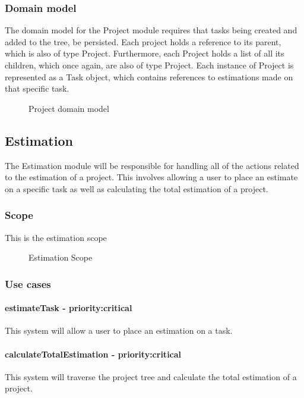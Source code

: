 \subsubsection{Domain model}
The domain model for the Project module requires that tasks being created and added to the tree, be persisted. Each project holds a reference to its parent, which is also of type Project. Furthermore, each Project holds a list of all its children, which once again, are also of type Project. Each instance of Project is represented as a Task object, which contains references to estimations made on that specific task.
\begin{figure}[H]
	\centering
	\caption{Project domain model}
	\label{fig:Project_domain_model}
\end{figure}
\subsection{Estimation}
	The Estimation module will be responsible for handling all of the actions related to the estimation of a project. This involves allowing a user to place an estimate on a specific task as well as calculating the total estimation of a project.
\subsubsection{Scope}
	This is the estimation scope
	\begin{figure}[H]
	    	\centering
	    	\caption{Estimation Scope}
	    	\label{fig:Estimation_Scope}
   	\end{figure}
\subsubsection{Use cases}
	\paragraph{estimateTask - priority:critical}This system will allow a user to place an estimation on a task.
	\paragraph{calculateTotalEstimation - priority:critical}This system will traverse the project tree and calculate the total estimation of a project.
